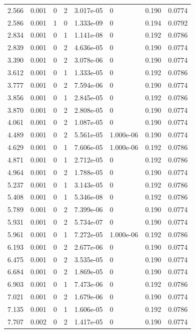 \documentclass[preview]{standalone}
\begin{document}
{{\begin{tabular}{L{1.2cm}C{1.2cm} C{0.3cm}C{0.5cm} C{1.4cm}C{1.4cm} C{1.4cm}C{1.4cm}}
  2.566  &  0.001  & 0     &  2 &  3.017e-05  & 0  & 0.190 &  0.0774   \\ 
  2.586  &  0.001  & 1     &  0 &  1.333e-09  & 0  & 0.194 &  0.0792   \\ 
  2.834  &  0.001  & 0     &  1 &  1.141e-08  & 0  & 0.192 &  0.0786   \\ 
  2.839  &  0.001  & 0     &  2 &  4.636e-05  & 0  & 0.190 &  0.0774   \\ 
  3.390  &  0.001  & 0     &  2 &  3.078e-06  & 0  & 0.190 &  0.0774   \\ 
  3.612  &  0.001  & 0     &  1 &  1.333e-05  & 0  & 0.192 &  0.0786   \\ 
  3.777  &  0.001  & 0     &  2 &  7.594e-06  & 0  & 0.190 &  0.0774   \\ 
  3.856  &  0.001  & 0     &  1 &  2.845e-05  & 0  & 0.192 &  0.0786   \\ 
  3.870  &  0.001  & 0     &  2 &  2.808e-05  & 0  & 0.190 &  0.0774   \\ 
  4.061  &  0.001  & 0     &  2 &  1.087e-05  & 0  & 0.190 &  0.0774   \\ 
  4.489  &  0.001  & 0     &  2 &  5.561e-05  & 1.000e-06  & 0.190 &  0.0774   \\ 
  4.629  &  0.001  & 0     &  1 &  7.606e-05  & 1.000e-06  & 0.192 &  0.0786   \\ 
  4.871  &  0.001  & 0     &  1 &  2.712e-05  & 0  & 0.192 &  0.0786   \\ 
  4.964  &  0.001  & 0     &  2 &  1.788e-05  & 0  & 0.190 &  0.0774   \\ 
  5.237  &  0.001  & 0     &  1 &  3.143e-05  & 0  & 0.192 &  0.0786   \\ 
  5.408  &  0.001  & 0     &  1 &  5.346e-08  & 0  & 0.192 &  0.0786   \\ 
  5.789  &  0.001  & 0     &  2 &  7.399e-06  & 0  & 0.190 &  0.0774   \\ 
  5.931  &  0.001  & 0     &  2 &  5.734e-07  & 0  & 0.190 &  0.0774   \\ 
  5.961  &  0.001  & 0     &  1 &  7.272e-05  & 1.000e-06  & 0.192 &  0.0786   \\ 
  6.193  &  0.001  & 0     &  2 &  2.677e-06  & 0  & 0.190 &  0.0774   \\ 
  6.475  &  0.001  & 0     &  2 &  3.535e-05  & 0  & 0.190 &  0.0774   \\ 
  6.684  &  0.001  & 0     &  2 &  1.869e-05  & 0  & 0.190 &  0.0774   \\ 
  6.903  &  0.001  & 0     &  1 &  7.473e-06  & 0  & 0.192 &  0.0786   \\ 
  7.021  &  0.001  & 0     &  2 &  1.679e-06  & 0  & 0.190 &  0.0774   \\ 
  7.135  &  0.001  & 0     &  1 &  1.606e-05  & 0  & 0.192 &  0.0786   \\ 
  7.707  &  0.002  & 0     &  2 &  1.417e-05  & 0  & 0.190 &  0.0774   \\ 
\hline 
\end{tabular} 

}}
\end{document}
